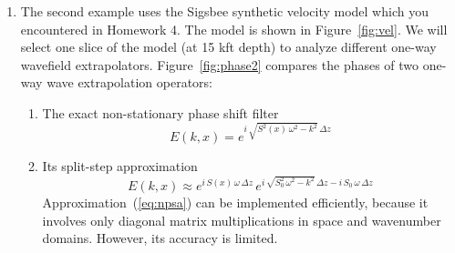 \begin{enumerate}




\lstset{language=python,numbers=left,numberstyle=\tiny,showstringspaces=false}



\item The second example uses the Sigsbee synthetic velocity model which
  you encountered in Homework 4. The model is shown in
  Figure~\ref{fig:vel}. We will select one slice of the model (at 15
  kft depth) to analyze different one-way wavefield
  extrapolators. Figure~\ref{fig:phase2} 
  compares the phases of two one-way wave
  extrapolation operators:
  \begin{enumerate}
  \item The exact non-stationary phase shift filter
    \begin{equation}
      \label{eq:nps}
      E(k,x) = e^{i\,\sqrt{S^2(x)\,\omega^2 - k^2}\,\Delta z}
    \end{equation}
  \item Its split-step approximation
    \begin{equation}
      \label{eq:npsa}
      E(k,x) \approx e^{i\,S(x)\,\omega\,\Delta z}\,e^{i\,\sqrt{S_0^2\,\omega^2 - k^2}\,\Delta z-i\,S_0\,\omega\,\Delta z}
    \end{equation}
    Approximation~(\ref{eq:npsa}) can be implemented efficiently, 
    because it involves only diagonal matrix multiplications in space and wavenumber domains. However, its accuracy is limited.
  \end{enumerate}   
  

\end{enumerate}
